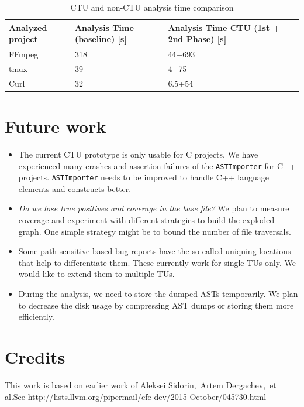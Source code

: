\documentclass{article}
\begin{document}
\begin {table}[h!]
\centering
\begin{tabular}{| L{2cm}| C{2cm} | C{2cm} | C{2cm}|}
  \hline
  Analyzed project& Analysis Time (baseline) {\scriptsize [s]} &Analysis Time CTU (1st + 2nd Phase) {\scriptsize [s]}\\
  \hline
  \hline
  FFmpeg& 318&44+693\\
  \hline
  tmux& 39&4+75\\
  \hline
  Curl& 32&6.5+54\\
  \hline  
\end{tabular}
\caption{CTU and non-CTU analysis time comparison}
\label{tbltime}
\end{table}

\section{Future work}

\begin{itemize}
  \item The current CTU prototype is only usable for C projects.
    We have experienced many crashes and assertion failures of the
    \texttt{ASTImporter} for C++ projects.
    \texttt{ASTImporter} needs to be improved to handle C++ language elements
    and constructs better.

  \item \emph{Do we lose true positives and coverage in the base file?}
    We plan to measure coverage and experiment with different strategies
    to build the exploded graph. One simple strategy might be to bound
    the number of file traversals.

  \item Some path sensitive based bug reports have the so-called uniquing locations that help
    to differentiate them. These currently work for single TUs only.
    We would like to extend them to multiple TUs.

  \item During the analysis, we need to store the dumped ASTs temporarily.
    We plan to decrease the disk usage by compressing AST dumps or
    storing them more efficiently.
\end{itemize}

\section{Credits}
This work is based on earlier work of Aleksei Sidorin,\ Artem Dergachev,\ 
et al.\@ See \url{http://lists.llvm.org/pipermail/cfe-dev/2015-October/045730.html}
\end{document}
